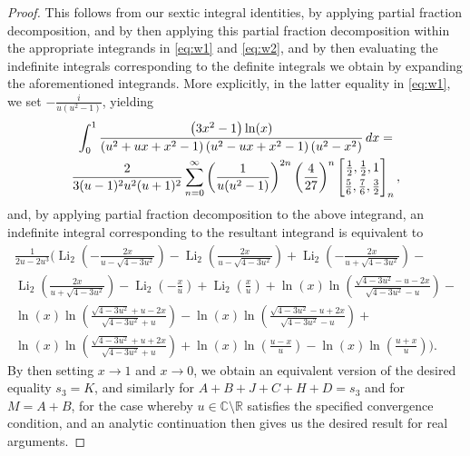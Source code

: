 \documentclass[12pt]{article}
\begin{document}
{\begin{proof}
 This follows from our sextic integral identities, by applying partial fraction decomposition, and by then applying this partial fraction decomposition within the appropriate integrands in 
 \eqref{eq:w1} and \eqref{eq:w2}, and by then evaluating the indefinite integrals corresponding to the definite integrals we 
 obtain by expanding the aforementioned integrands. More explicitly, in the latter equality in 
 \eqref{eq:w1}, we set $-\frac{i}{u \left(u^2-1\right)}$, yielding 
\begin{multline*}
 \int_{0}^{1} \frac{\left(3 x^2 - 
 1\right) \ln (x)}{\left(u^2+u x+x^2-1\right) \left(u^2-u x+x^2-1\right) \left(u^2-x^2\right)} \, dx = \\ 
 \frac{2}{3 (u-1)^2 u^2 (u+1)^2} \sum_{n=0}^{\infty} 
 \left( \frac{1}{u(u^2-1)} \right)^{2n} \left( \frac{4}{27} \right)^{n} 
 \left[ \begin{matrix} \frac{1}{2}, \frac{1}{2}, 1 
 \vspace{1mm} \\ 
 \frac{5}{6}, \frac{7}{6}, \frac{3}{2} \end{matrix} \right]_{n}, 
\end{multline*}
 and, by applying partial fraction decomposition 
 to the above integrand, an indefinite integral 
 corresponding to the resultant integrand is equivalent to 
\begin{multline*}
 \frac{1}{2 u-2 u^3} \Bigg( \operatorname{Li}_2\left(-\frac{2 x}{u-\sqrt{4-3 u^2}}\right) - 
 \operatorname{Li}_2\left(\frac{2 x}{u-\sqrt{4-3 u^2}}\right)+\operatorname{Li}_2\left(-\frac{2
 x}{u+\sqrt{4-3 u^2}}\right) - \\ 
 \operatorname{Li}_2\left(\frac{2 x}{u+\sqrt{4-3
 u^2}}\right)-\operatorname{Li}_2\left(-\frac{x}{u}\right)+\operatorname{Li}_2\left(\frac{x}{u}\right) + \ln (x) \ln \left(\frac{\sqrt{4-3 u^2}-u-2
 x}{\sqrt{4-3 u^2}-u}\right) - \\ 
 \ln (x) \ln \left(\frac{\sqrt{4-3 u^2}+u-2 x}{\sqrt{4-3 u^2}+u}\right)-\ln (x) \ln \left(\frac{\sqrt{4-3
 u^2}-u+2 x}{\sqrt{4-3 u^2}-u}\right) + \\ 
 \ln (x) \ln \left(\frac{\sqrt{4-3 u^2}+u+2 x}{\sqrt{4-3 u^2}+u}\right)+\ln (x) \ln
 \left(\frac{u-x}{u}\right)-\ln (x) \ln \left(\frac{u+x}{u}\right) \Bigg). 
\end{multline*}
 By then setting $x \to 1$ and $x \to 0$, we obtain an equivalent version of the desired equality $s_3 = K$, 
 and similarly for 
 $ A + B + J + C + H + D = s_3$ and for $ M = A + B$, for the case whereby
 $u \in \mathbb{C} \setminus \mathbb{R}$ satisfies the specified convergence condition, 
 and an analytic continuation then gives us the desired result for real arguments. 
\end{proof}





}
\end{document}

